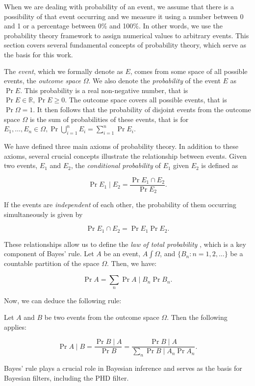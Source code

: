 When we are dealing with probability of an event, we assume that there is a possibility
of that event occurring and we measure it using a number between 0 and 1 or a percentage
between 0\% and 100\%. In other words, we use the probability theory framework to assign
numerical values to arbitrary events. This section covers several fundamental concepts of
probability theory, which serve as the basis for this work.

The \textit{event}, which we formally denote as $E$, comes from some space of all possible
events, the \textit{outcome space} $\Omega$. We also denote the \textit{probability} of the
event $E$ as $\Pr{E}$. This probability is a real non-negative number,
that is $\Pr{E} \in \mathbb{R}, \Pr{E} \geq 0$. The outcome
space covers all possible events, that is $\Pr{\Omega} = 1$. It then follows
that the probability of disjoint events from the outcome space $\Omega$ is the sum of
probabilities of these events, that is for
$E_1, \ldots, E_n \in \Omega, \Pr{\bigcup_{i=1}^n E_i} = \sum_{i=1}^n \Pr{E_i}$.

We have defined three main axioms of probability theory. In addition to these axioms, several
crucial concepts illustrate the relationship between events. Given two events, $E_1$ and $E_2$,
the \textit{conditional probability} of $E_1$ given $E_2$ is defined as

$$
\Pr{E_1 \mid E_2} = \frac{\Pr{E_1 \cap E_2}}{\Pr{E_2}}.
$$

If the events are \textit{independent} of each other, the probability of them occurring
simultaneously is given by

$$
\Pr{E_1 \cap E_2} = \Pr{E_1}\Pr{E_2}.
$$

These relationships allow us to define the \textit{law of total probability}
\cite[31]{zwillingerCRCStandardProbability2000}, which is a key component of Bayes' rule.
Let $A$ be an event, $A \int \Omega$, and $\{B_n : n = 1, 2, \ldots\}$ be a countable
partition of the space $\Omega$. Then, we have:

$$
\Pr{A} = \sum_n \Pr{A \mid B_n} \Pr{B_n}.
$$

Now, we can deduce the following rule:

\begin{definition}
Let $A$ and $B$ be two events from the outcome space $\Omega$. Then the following applies:

$$
\Pr{A \mid B} = \frac{\Pr{B \mid A}}{\Pr{B}}
    = \frac{\Pr{B \mid A}}{\sum_n \Pr{B \mid A_n}\Pr{A_n}}.
$$
\end{definition}

Bayes' rule plays a crucial role in Bayesian inference and serves as the basis for
Bayesian filters, including the PHD filter.
